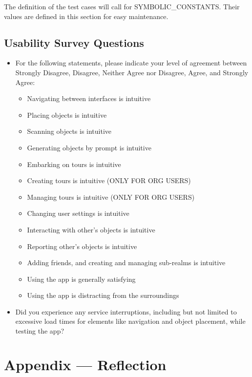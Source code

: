 \documentclass[12pt, titlepage]{article}
\begin{document}
The definition of the test cases will call for SYMBOLIC\_CONSTANTS.
Their values are defined in this section for easy maintenance.

\subsection{Usability Survey Questions} \label{sub:usability_survey}

\begin{itemize}
  \item For the following statements, please indicate your level of agreement between Strongly Disagree, Disagree, Neither Agree nor Disagree, Agree, and Strongly Agree:
        \begin{itemize}
          \item Navigating between interfaces is intuitive
          \item Placing objects is intuitive
          \item Scanning objects is intuitive
          \item Generating objects by prompt is intuitive
          \item Embarking on tours is intuitive
          \item Creating tours is intuitive (ONLY FOR ORG USERS)
          \item Managing tours is intuitive (ONLY FOR ORG USERS)
          \item Changing user settings is intuitive
          \item Interacting with other's objects is intuitive
          \item Reporting other's objects is intuitive
          \item Adding friends, and creating and managing sub-realms is intuitive
          \item Using the app is generally satisfying
          \item Using the app is distracting from the surroundings
        \end{itemize}
  \item Did you experience any service interruptions, including but not limited to excessive load times for elements like navigation and object placement, while testing the app? \\
\end{itemize}

\newpage{}
\section*{Appendix --- Reflection}
\end{document}
